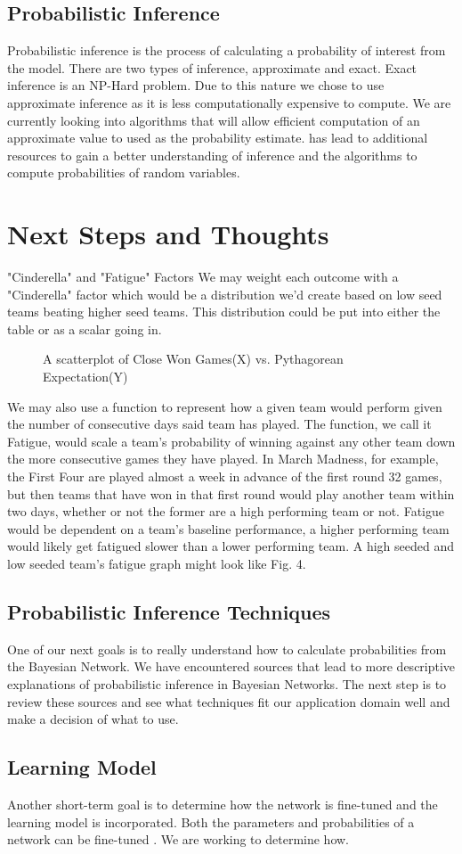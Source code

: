 \documentclass{acm_proc_article-sp}
\begin{document}
\subsection{Probabilistic Inference}
Probabilistic inference is the process of calculating a probability of interest from the model. 
There are two types of inference, approximate and exact. Exact inference is an NP-Hard problem. Due 
to this nature we chose to use approximate inference as it is less computationally expensive to 
compute. We are currently looking into algorithms that will allow efficient computation of an 
approximate value to used as the probability estimate. \cite{heckerman} has lead to additional 
resources to gain 
a better understanding of inference and the algorithms to compute probabilities of random variables.
\newpage
\section{Next Steps and Thoughts}
"Cinderella" and "Fatigue" Factors
We may weight each outcome with a "Cinderella" factor which would be a distribution we'd create 
based on low seed teams beating higher seed teams. This distribution could be put into either the 
table or as a scalar going in.
\begin{figure}
\centering
{}
\caption{A scatterplot of Close Won Games(X) vs. Pythagorean Expectation(Y)}
\end{figure}
We may also use a function to represent how a given team would perform given the number of 
consecutive days said team has played. The function, we call it Fatigue, would scale a team’s 
probability of winning against any other team down the more consecutive games they have played. In 
March Madness, for example, the First Four are played almost a week in advance of the first round 32 
games, but then teams that have won in that first round would play another team within two days, 
whether or not the former are a high performing team or not. Fatigue would be dependent on a team’s 
baseline performance, a higher performing team would likely get fatigued slower than a lower 
performing team. A high seeded and low seeded team’s fatigue graph might look like Fig. 4.
\subsection{Probabilistic Inference Techniques}
One of our next goals is to really understand how to calculate probabilities from the Bayesian 
Network. We have encountered sources that lead to more descriptive explanations of probabilistic 
inference in Bayesian Networks. The next step is to review these sources and see what techniques fit 
our application domain well and make a decision of what to use.\cite{ruiz, ben}
\subsection{Learning Model}
Another short-term goal is to determine how the network is fine-tuned and the learning model is 
incorporated. Both the parameters and probabilities of a network can be fine-tuned \cite{heckerman}. 
We are working to determine how. 
\newpage


\end{document}
